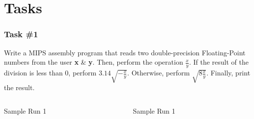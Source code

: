 \documentclass[
	11pt, %
]{beamer}
\begin{document}

\section{Tasks}

\begin{frame}
	\frametitle{Task \#1}
	\justifying
		Write a MIPS assembly program that reads two double-precision Floating-Point numbers from the user \textbf{x} \& \textbf{y}. 
		Then, perform the operation $\frac{x}{y}$. If the result of the division is less than 0, perform $ 3.14 \sqrt{-\frac{x}{y}} $. 
		Otherwise, perform $\sqrt{8\frac{x}{y}}$. Finally, print the result.
		\vspace{0.5cm}
	\begin{columns}[c]
		\begin{column}{0.5\textwidth}
			\centering
			Sample Run 1

		\end{column}
		\begin{column}{0.5\textwidth}
		\centering
			\centering
			Sample Run 1

			
		\end{column}
	\end{columns}
\end{frame}
\end{document}
